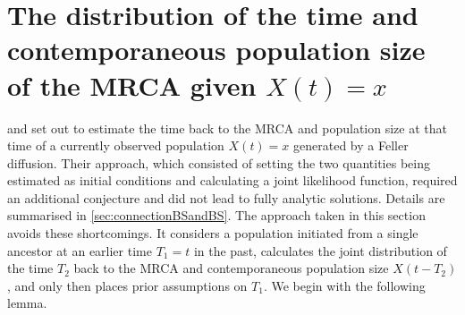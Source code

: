 \documentclass[preprint,12pt]{elsarticle}
\begin{document}
%

\section{The distribution of the time and contemporaneous population size of the MRCA given $X(t) = x$}
\label{sec:MRCAgivenX}

\citet{burden2016genetic} and \citet{BurdenSoewongsoso19} set out to estimate the time back to the MRCA and population size at that time 
of a currently observed population $X(t) = x$ generated by a Feller diffusion.  Their approach, which consisted of setting the two quantities being estimated 
as initial conditions and calculating a joint likelihood function, required an additional conjecture and did not lead to fully analytic solutions.  
Details are summarised in \ref{sec:connectionBSandBS}.  The approach taken in this section avoids these shortcomings.  It 
considers a population initiated from a single ancestor at an earlier time $T_1 = t$ in the past, calculates the joint distribution of the time $T_2$ back to the MRCA and 
contemporaneous population size $X(t -T_2)$, and only then places prior assumptions on  $T_1$.  We begin with the following lemma.  
\end{document}
